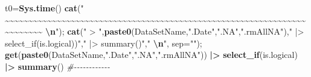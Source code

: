 \documentclass[
]{article}
\newenvironment{Shaded}{\begin{snugshade}}{\end{snugshade}}
\newcommand{\AttributeTok}[1]{\textcolor[rgb]{0.13,0.29,0.53}{#1}}
\newcommand{\CommentTok}[1]{\textcolor[rgb]{0.56,0.35,0.01}{\textit{#1}}}
\newcommand{\FunctionTok}[1]{\textcolor[rgb]{0.13,0.29,0.53}{\textbf{#1}}}
\newcommand{\NormalTok}[1]{#1}
\newcommand{\OtherTok}[1]{\textcolor[rgb]{0.56,0.35,0.01}{#1}}
\newcommand{\SpecialCharTok}[1]{\textcolor[rgb]{0.81,0.36,0.00}{\textbf{#1}}}
\newcommand{\StringTok}[1]{\textcolor[rgb]{0.31,0.60,0.02}{#1}}
\begin{document}
\begin{Shaded}
\begin{Highlighting}[]
\NormalTok{t0}\OtherTok{=}\FunctionTok{Sys.time}\NormalTok{()}
\FunctionTok{cat}\NormalTok{(}\StringTok{"    \textasciitilde{}\textasciitilde{}\textasciitilde{}\textasciitilde{}\textasciitilde{}\textasciitilde{}\textasciitilde{}\textasciitilde{}\textasciitilde{}\textasciitilde{}\textasciitilde{}\textasciitilde{}\textasciitilde{}\textasciitilde{}\textasciitilde{}\textasciitilde{}\textasciitilde{}\textasciitilde{}\textasciitilde{}\textasciitilde{}\textasciitilde{}\textasciitilde{}\textasciitilde{}\textasciitilde{}\textasciitilde{}\textasciitilde{}\textasciitilde{}\textasciitilde{}\textasciitilde{}\textasciitilde{}\textasciitilde{}\textasciitilde{}\textasciitilde{}\textasciitilde{}\textasciitilde{}\textasciitilde{}\textasciitilde{}\textasciitilde{}\textasciitilde{}\textasciitilde{}\textasciitilde{}\textasciitilde{}\textasciitilde{}\textasciitilde{}\textasciitilde{}\textasciitilde{}\textasciitilde{}\textasciitilde{}\textasciitilde{}\textasciitilde{}\textasciitilde{}\textasciitilde{}\textasciitilde{}\textasciitilde{}\textasciitilde{}\textasciitilde{}\textasciitilde{}\textasciitilde{}\textasciitilde{}\textasciitilde{}\textasciitilde{}\textasciitilde{}\textasciitilde{}\textasciitilde{}\textasciitilde{}\textasciitilde{}\textasciitilde{}\textasciitilde{}\textasciitilde{}\textasciitilde{}\textasciitilde{}\textasciitilde{}    }\SpecialCharTok{\textbackslash{}n}\StringTok{"}\NormalTok{); }\FunctionTok{cat}\NormalTok{(}\StringTok{" \textgreater{} "}\NormalTok{,}\FunctionTok{paste0}\NormalTok{(DataSetName,}\StringTok{".Date"}\NormalTok{,}\StringTok{".NA"}\NormalTok{,}\StringTok{".rmAllNA"}\NormalTok{),}\StringTok{" |\textgreater{} select\_if(is.logical))"}\NormalTok{,}\StringTok{" |\textgreater{} summary()"}\NormalTok{,}\StringTok{"  }\SpecialCharTok{\textbackslash{}n}\StringTok{"}\NormalTok{, }\AttributeTok{sep=}\StringTok{""}\NormalTok{); }\FunctionTok{get}\NormalTok{(}\FunctionTok{paste0}\NormalTok{(DataSetName,}\StringTok{".Date"}\NormalTok{,}\StringTok{".NA"}\NormalTok{,}\StringTok{".rmAllNA"}\NormalTok{)) }\SpecialCharTok{|\textgreater{}} \FunctionTok{select\_if}\NormalTok{(is.logical) }\SpecialCharTok{|\textgreater{}} \FunctionTok{summary}\NormalTok{() }\CommentTok{\#{-}{-}{-}{-}{-}{-}{-}{-}{-}{-}{-}{-}  }

\end{Highlighting}
\end{Shaded}
\end{document}
